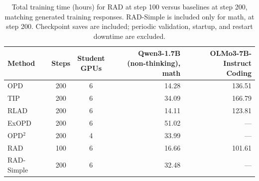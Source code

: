 \begin{table}[H]
\caption{Total training time (hours) for RAD at step 100 versus baselines at
step 200, matching generated training responses. RAD-Simple is included only
for math, at step 200. Checkpoint saves
are included; periodic validation, startup, and restart downtime are
excluded.}
\label{tab:training-step-comparison}
\centering
\normalsize
\setlength{\tabcolsep}{4pt}
\renewcommand{\arraystretch}{1.08}
\begin{tabular*}{\linewidth}{@{\extracolsep{\fill}}lccrr@{}}
\toprule
Method & Steps & \shortstack{Student\\GPUs}
& \shortstack{Qwen3-1.7B\\(non-thinking), math}
& \shortstack{OLMo3-7B-Instruct\\Coding} \\
\midrule
OPD & 200 & 6 & 14.28 & 136.51 \\
TIP & 200 & 6 & 34.09 & 166.79 \\
RLAD & 200 & 6 & 14.11 & 123.81 \\
ExOPD & 200 & 6 & 51.02 & --- \\
OPD$^2$ & 200 & 4 & 33.99 & --- \\
\midrule
RAD & 100 & 6 & 16.66 & 101.61 \\
RAD-Simple & 200 & 6 & 32.48 & --- \\
\bottomrule
\end{tabular*}
\end{table}
